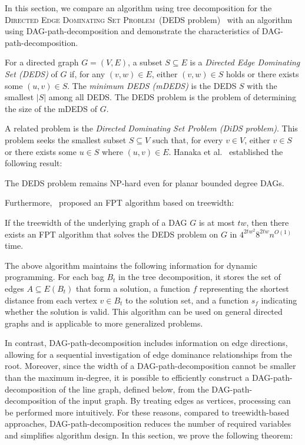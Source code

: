 \documentclass[runningheads]{llncs}
\theoremstyle{plain}
\theoremstyle{definition}
\begin{document}
In this section, we compare an algorithm using tree decomposition for the \textsc{Directed Edge Dominating Set Problem}~(DEDS problem)~\cite{art22} with an algorithm using DAG-path-decomposition and demonstrate the characteristics of DAG-path-decomposition.  

For a directed graph \(G = (V, E)\), a subset \(S \subseteq E\) is a \emph{Directed Edge Dominating Set (DEDS)} of \(G\) if, for any \((v, w) \in E\), either \((v, w) \in S\) holds or there exists some \((u, v) \in S\).  
The \emph{minimum DEDS (mDEDS)} is the DEDS \(S\) with the smallest \(|S|\) among all DEDS.  
The DEDS problem is the problem of determining the size of the mDEDS of \(G\).  

A related problem is the \emph{Directed Dominating Set Problem (DiDS problem)}.  
This problem seeks the smallest subset \(S \subseteq V\) such that, for every \(v \in V\), either \(v \in S\) or there exists some \(u \in S\) where \((u, v) \in E\).  
Hanaka et al.~\cite{art23} established the following result:  

\begin{proposition}
    The DEDS problem remains NP-hard even for planar bounded degree DAGs.
\end{proposition}

Furthermore,~\cite{art22} proposed an FPT algorithm based on treewidth:  

\begin{proposition}
    If the treewidth of the underlying graph of a DAG \(G\) is at most \(tw\), then there exists an FPT algorithm that solves the DEDS problem on \(G\) in \(4^{2tw^2} 8^{2tw} n^{O(1)}\) time.  
\end{proposition}

The above algorithm maintains the following information for dynamic programming. For each bag \(B_t\) in the tree decomposition, it stores the set of edges \(A \subseteq E(B_t)\) that form a solution, a function \(f\) representing the shortest distance from each vertex \(v \in B_t\) to the solution set, and a function \(s_f\) indicating whether the solution is valid.  
This algorithm can be used on general directed graphs and is applicable to more generalized problems.  

In contrast, DAG-path-decomposition includes information on edge directions, allowing for a sequential investigation of edge dominance relationships from the root.  
Moreover, since the width of a DAG-path-decomposition cannot be smaller than the maximum in-degree, it is possible to efficiently construct a DAG-path-decomposition of the line graph, defined below, from the DAG-path-decomposition of the input graph.  
By treating edges as vertices, processing can be performed more intuitively.  
For these reasons, compared to treewidth-based approaches, DAG-path-decomposition reduces the number of required variables and simplifies algorithm design.  
In this section, we prove the following theorem:  
\end{document}
